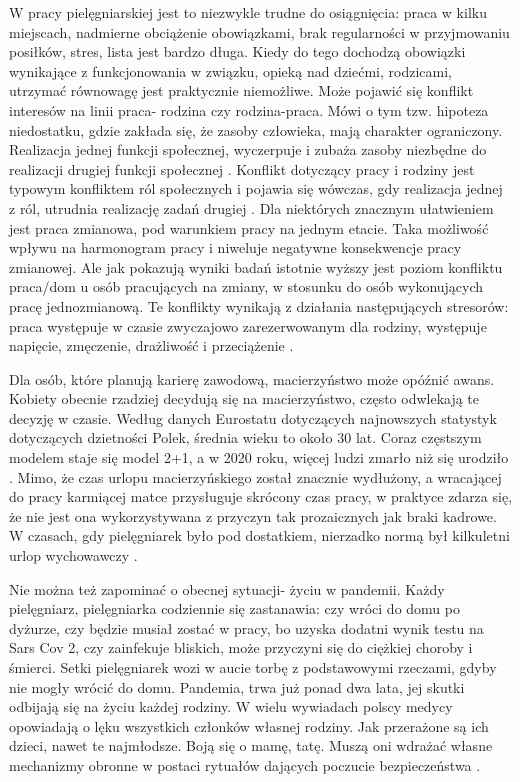 \documentclass[a4paper,12pt,twoside,openany]{report}
\begin{document}
W pracy pielęgniarskiej jest to niezwykle trudne do osiągnięcia: praca w kilku miejscach, nadmierne obciążenie obowiązkami, brak regularności w przyjmowaniu posiłków, stres, lista jest bardzo długa. Kiedy do tego dochodzą obowiązki wynikające z funkcjonowania w związku, opieką nad dziećmi, rodzicami, utrzymać równowagę jest praktycznie niemożliwe. Może pojawić się konflikt interesów na linii praca- rodzina czy rodzina-praca. Mówi o tym tzw. hipoteza niedostatku,  gdzie zakłada się, że zasoby człowieka, mają charakter ograniczony. Realizacja jednej funkcji społecznej, wyczerpuje i zubaża zasoby niezbędne do realizacji drugiej funkcji społecznej \cite{hipoteza}. Konflikt dotyczący pracy i rodziny jest typowym konfliktem ról społecznych i pojawia się wówczas, gdy realizacja jednej z ról, utrudnia realizację zadań drugiej \cite{relacja}. Dla niektórych znacznym ułatwieniem jest praca zmianowa, pod warunkiem pracy na jednym etacie. Taka możliwość wpływu na harmonogram pracy i niweluje negatywne konsekwencje pracy zmianowej. Ale jak pokazują wyniki badań  istotnie wyższy jest poziom konfliktu praca/dom u osób pracujących na zmiany, w stosunku do osób wykonujących pracę jednozmianową. Te konflikty wynikają z działania następujących stresorów: praca występuje w czasie zwyczajowo zarezerwowanym dla rodziny, występuje napięcie, zmęczenie, drażliwość i przeciążenie \cite{konflikt}.
  
Dla osób, które planują karierę zawodową, macierzyństwo może opóźnić awans. Kobiety obecnie rzadziej decydują się na macierzyństwo, często odwlekają te decyzję w czasie. Według danych Eurostatu dotyczących najnowszych statystyk dotyczących dzietności Polek, średnia wieku to około 30 lat. Coraz częstszym modelem staje się model 2+1, a w 2020 roku, więcej ludzi zmarło niż się urodziło \cite{dzieci}. Mimo, że czas urlopu macierzyńskiego został znacznie wydłużony, a wracającej do pracy karmiącej matce przysługuje skrócony czas pracy, w praktyce zdarza się, że nie jest ona wykorzystywana z przyczyn tak prozaicznych jak braki kadrowe. W czasach, gdy pielęgniarek było pod dostatkiem, nierzadko normą był kilkuletni urlop wychowawczy \cite{urlop}.

Nie można też zapominać o obecnej sytuacji- życiu w pandemii. Każdy pielęgniarz, pielęgniarka codziennie się zastanawia: czy wróci do domu po dyżurze, czy będzie musiał zostać w pracy, bo uzyska dodatni wynik testu na Sars Cov 2, czy  zainfekuje bliskich, może przyczyni się do ciężkiej choroby i śmierci. Setki pielęgniarek wozi w aucie torbę z podstawowymi rzeczami, gdyby nie mogły wrócić do domu. Pandemia, trwa już ponad dwa lata, jej skutki odbijają się na życiu każdej rodziny. W wielu wywiadach polscy medycy opowiadają o lęku wszystkich członków własnej rodziny. Jak przerażone są ich dzieci, nawet te najmłodsze. Boją się o mamę, tatę. Muszą oni  wdrażać własne mechanizmy obronne w postaci rytuałów dających poczucie bezpieczeństwa  \cite{wywiad}.
\end{document}
